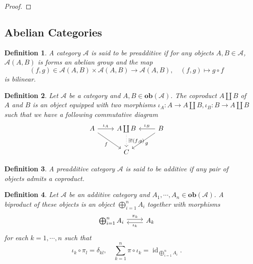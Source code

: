 \documentclass{article}
\newtheorem{definition}{Definition}[section]
\numberwithin{equation}{section}
\DeclareMathOperator{\id}{id}
\begin{document}
\begin{proof}
\end{proof}

\subsection{Abelian Categories}

\begin{definition}
A category $\mathscr{A}$ is said to be preadditive if for any objects $A,B\in\mathscr{A}$, $\mathscr{A}(A,B)$ is forms an abelian group and the map 
\begin{equation*}
(f,g)\in\mathscr{A}(A,B)\times \mathscr{A}(A,B)\to \mathscr{A}(A,B),\quad (f,g)\mapsto g\circ f
\end{equation*}
is bilinear.
\end{definition}

\begin{definition}
Let $\mathscr{A}$ be a category and $A,B\in\mathbf{ob}(\mathscr{A})$. The coproduct $A\coprod B$ of $A$ and $B$ is an object equipped with two morphisms $\iota_A:A\to A\coprod B,\iota_B:B\to A\coprod B$ such that we have a following commutative diagram
\[
\begin{tikzcd}
A \arrow[rd, "f"'] \arrow[r, "\iota_A"] & A\coprod B \arrow[d, "{\exists!(f,g)}", dotted] & B \arrow[ld, "g"] \arrow[l, "\iota_B"'] \\
                                        & C                                               &                                        
\end{tikzcd}
\]
\end{definition}

\begin{definition}
A preadditive category $\mathscr{A}$ is said to be additive if any pair of objects admits a coproduct.
\end{definition}

\begin{definition}
Let $\mathscr{A}$ be an additive category and $A_1,\cdots,A_n\in\mathbf{ob}(\mathscr{A})$. A biproduct of these objects is an object $\bigoplus_{i=1}^n A_i$ together with morphisms 
\[
\begin{tikzcd}
\bigoplus_{i=1}^n A_i \arrow[r, "\pi_k", shift left] & A_k \arrow[l, "\iota_k", shift left]
\end{tikzcd}
\]
for each $k=1,\cdots,n$ such that 
\begin{equation*}
\iota_k\circ\pi_l = \delta_{kl},\quad \sum_{k=1}^n \pi\circ\iota_k = \id_{\bigoplus_{i=1}^n A_i}.
\end{equation*}
\end{definition}
\end{document}
